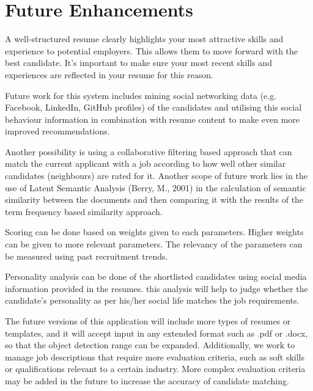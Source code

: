 \documentclass[12 pt, oneside]{book}
\begin{document}
\section{Future Enhancements}
A well-structured resume clearly highlights your most attractive skills and experience to potential employers. This allows them to move forward with the best candidate. It's important to make sure your most recent skills and experiences are reflected in your resume for this reason.
\newline
\par Future work for this system  includes mining social networking data  (e.g. Facebook, LinkedIn,  GitHub profiles) of  the candidates and utilising  this social behaviour information in combination with resume content to make even  more  improved  recommendations.  
\newline 
\par Another  possibility  is  using  a collaborative  filtering  based  approach  that  can  match  the  current applicant  with  a  job  according  to  how  well  other  similar  candidates (neighbours) are rated for it. Another scope of future work lies in the use of Latent Semantic Analysis (Berry, M., 2001) in the calculation of semantic similarity between the documents and then comparing it with the results of the term frequency based similarity approach.
\newline
\par Scoring can be done based on weights given to each parameters. Higher weights can be given to more relevant parameters. The relevancy of the parameters can be measured using past recruitment trends.
\newline
\par Personality analysis can be done of the shortlisted candidates using social media information provided in the resumes. this analysis will help to judge whether the candidate's personality as per his/her social life matches the job requirements.
\newline
\par The future versions of this application will include more types of resumes or templates, and it will accept input in any extended format  such as .pdf or .docx, so that the object detection range can be expanded. 
Additionally, we work to manage job descriptions that require more evaluation criteria, such as soft skills or qualifications relevant to a certain industry. More complex evaluation criteria may be added in the future to increase the accuracy of candidate matching.
\newline
\end{document}
